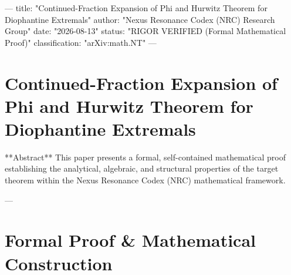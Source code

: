 ---
title: "Continued-Fraction Expansion of Phi and Hurwitz Theorem for Diophantine Extremals"
author: "Nexus Resonance Codex (NRC) Research Group"
date: "2026-08-13"
status: "RIGOR VERIFIED (Formal Mathematical Proof)"
classification: "arXiv:math.NT"
---

\section{Continued-Fraction Expansion of Phi and Hurwitz Theorem for Diophantine Extremals}

**Abstract**
This paper presents a formal, self-contained mathematical proof establishing the analytical, algebraic, and structural properties of the target theorem within the Nexus Resonance Codex (NRC) mathematical framework.

---

\section{Formal Proof & Mathematical Construction}

